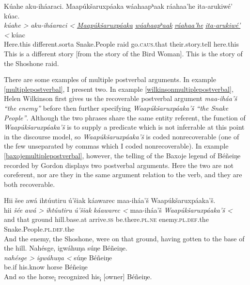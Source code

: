\documentclass[output=paper]{LSP/langsci}
\begin{document}
\ea\label{wilkinsonpostverbal}
Kúahe aku-iháaraci. Maapúkšaruxpáaka wáahaapʰaak ráahaa’he ita-arukiwé’ kúac.\footnotemark\\
\gll	\emph{kúahe >}	\emph{aku-iháaraci <}	\emph{\underline{Maapúkšaruxpáaka}} 	\emph{\underline{wáahaapʰaak}} 	\emph{\underline{ráahaa’he}}			\emph{\underline{ita-arukiwé’} <}		kúac\\
	Here.this 		different.sorta		Snake.People 					raid 						go.\textsc{caus}.that 				their.story.tell 					here.this\\
\glt	This is a different story [from the story of the Bird Woman]. This is the story of the Shoshone raid.
\z

There are some examples of multiple postverbal arguments. In example \ref{multiplepostverbal}, I present two. In example \ref{wilkinsonmultiplepostverbal}, Helen Wilkinson first gives us the recoverable postverbal argument \emph{maa-iháa’š “the enemy”} before then further specifying \emph{Waapúkšaruxpáaka’š “the Snake People”}. Although the two phrases share the same entity referent, the function of \emph{Waapúkšaruxpáaka’š} is to supply a predicate which is not inferrable at this point in the discourse model, so \emph{Waapúkšaruxpáaka’š} is coded nonrecoverable (one of the few unseparated by commas which I coded nonrecoverable). In example \ref{baxojemultiplepostverbal}, however, the telling of the Baxoje legend of Béñeiŋe recorded by Gordon \citet{Marsh1936} displays two postverbal arguments. Here the two are not coreferent, nor are they in the same argument relation to the verb, and they are both recoverable. 

\ea\label{multiplepostverbal}
\ea\label{wilkinsonmultiplepostverbal}
Hii šee awá ihtúutiru ú’šiak káawarec maa-iháa’š Waapúkšaruxpáaka’š.\footnotemark\\
\gll	hii 		\emph{šée} 		\emph{awá >}		\emph{ihtúutiru} 			\emph{ú’šiak} 		\emph{káawarec <}	maa-iháa’š 				\emph{Waapúkšaruxpáaka’š <}\\
	and 		that	 		ground 			hill.base.at	 			arrive.\textsc{ss} 		be.there.\textsc{pl.ne}	enemy.\textsc{pl.def}.the 		Snake.People.\textsc{pl.def}.the\\
\glt	And the enemy, the Shoshone, were on that ground, having gotten to the base of the hill.
\ex\label{baxojemultiplepostverbal}
Nahésge, igwáhuŋa súŋe Béñeiŋe.\footnotemark\\
\gll	\emph{nahésge >}	\emph{igwáhuŋa <}	súŋe 		Béñeiŋe\\
	be.if 			his.know 			horse 		Béñeiŋe\\
\glt	And so the horse\textsubscript{i} recognized his\textsubscript{i} [owner] Béñeiŋe.
\z\z
\end{document}
